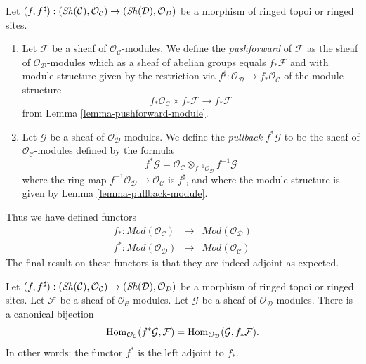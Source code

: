 \begin{definition}
\label{definition-pushforward}
Let
$(f, f^\sharp) :
(\mathop{\mathit{Sh}}\nolimits(\mathcal{C}), \mathcal{O}_\mathcal{C})
\to
(\mathop{\mathit{Sh}}\nolimits(\mathcal{D}), \mathcal{O}_\mathcal{D})$
be a morphism of ringed topoi or ringed sites.
\begin{enumerate}
\item Let $\mathcal{F}$ be a sheaf of $\mathcal{O}_\mathcal{C}$-modules.
We define the {\it pushforward} of $\mathcal{F}$ as the
sheaf of $\mathcal{O}_\mathcal{D}$-modules which as a sheaf
of abelian groups equals $f_*\mathcal{F}$ and with
module structure given by the restriction
via $f^\sharp : \mathcal{O}_\mathcal{D} \to f_*\mathcal{O}_\mathcal{C}$
of the module structure
$$
f_*\mathcal{O}_\mathcal{C} \times f_*\mathcal{F}
\longrightarrow
f_*\mathcal{F}
$$
from Lemma \ref{lemma-pushforward-module}.
\item Let $\mathcal{G}$ be a sheaf of $\mathcal{O}_\mathcal{D}$-modules.
We define the {\it pullback} $f^*\mathcal{G}$ to be the
sheaf of $\mathcal{O}_\mathcal{C}$-modules defined by the formula
$$
f^*\mathcal{G}
=
\mathcal{O}_\mathcal{C} \otimes_{f^{-1}\mathcal{O}_\mathcal{D}}
f^{-1}\mathcal{G}
$$
where the ring map
$f^{-1}\mathcal{O}_\mathcal{D} \to \mathcal{O}_\mathcal{C}$
is $f^\sharp$, and where the  module
structure is given by Lemma \ref{lemma-pullback-module}.
\end{enumerate}
\end{definition}

\noindent
Thus we have defined functors
\begin{eqnarray*}
f_* : \textit{Mod}(\mathcal{O}_\mathcal{C})
& \longrightarrow &
\textit{Mod}(\mathcal{O}_\mathcal{D}) \\
f^* : \textit{Mod}(\mathcal{O}_\mathcal{D})
& \longrightarrow &
\textit{Mod}(\mathcal{O}_\mathcal{C})
\end{eqnarray*}
The final result on these functors is that they are indeed
adjoint as expected.

\begin{lemma}
\label{lemma-adjoint-pullback-pushforward-modules}
Let
$(f, f^\sharp) :
(\mathop{\mathit{Sh}}\nolimits(\mathcal{C}), \mathcal{O}_\mathcal{C})
\to
(\mathop{\mathit{Sh}}\nolimits(\mathcal{D}), \mathcal{O}_\mathcal{D})$
be a morphism of ringed topoi or ringed sites.
Let $\mathcal{F}$ be a sheaf of $\mathcal{O}_\mathcal{C}$-modules.
Let $\mathcal{G}$ be a sheaf of $\mathcal{O}_\mathcal{D}$-modules.
There is a canonical bijection
$$
\mathop{\mathrm{Hom}}\nolimits_{\mathcal{O}_\mathcal{C}}(f^*\mathcal{G}, \mathcal{F})
=
\mathop{\mathrm{Hom}}\nolimits_{\mathcal{O}_\mathcal{D}}(\mathcal{G}, f_*\mathcal{F}).
$$
In other words: the functor $f^*$ is the left adjoint to
$f_*$.
\end{lemma}

